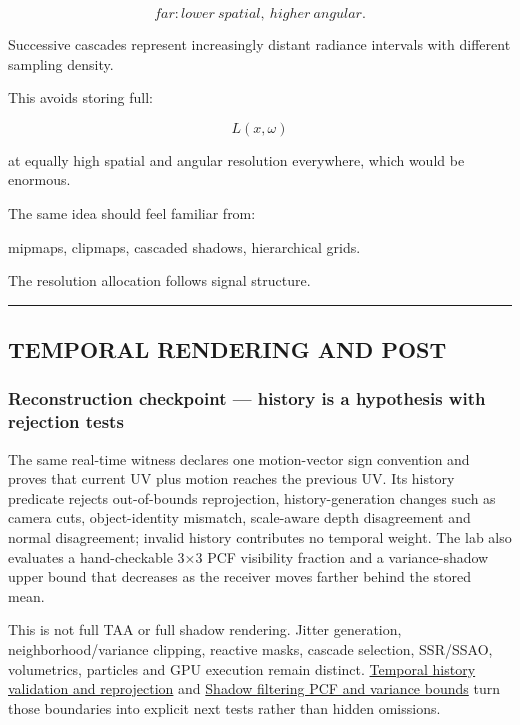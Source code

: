 \[
\boxed{
far:
lower\ spatial,\ higher\ angular.
}
\]

Successive cascades represent increasingly distant radiance intervals with different sampling density.

This avoids storing full:

\[
L(x,\omega)
\]

at equally high spatial and angular resolution everywhere, which would be enormous.

The same idea should feel familiar from:

mipmaps, clipmaps, cascaded shadows, hierarchical grids.

The resolution allocation follows signal structure.

\begin{center}\rule{0.5\linewidth}{0.5pt}\end{center}

\subsection{TEMPORAL RENDERING AND POST}\label{04-visual-computing-ii-ch040-temporal-rendering-and-post}

\subsubsection{Reconstruction checkpoint --- history is a hypothesis with rejection tests}\label{04-visual-computing-ii-ch040-reconstruction-checkpoint-history-is-a-hypothesis-with-rejection-tests}

The same real-time witness declares one motion-vector sign convention and proves that current UV plus motion reaches the previous UV. Its history predicate rejects out-of-bounds reprojection, history-generation changes such as camera cuts, object-identity mismatch, scale-aware depth disagreement and normal disagreement; invalid history contributes no temporal weight. The lab also evaluates a hand-checkable 3×3 PCF visibility fraction and a variance-shadow upper bound that decreases as the receiver moves farther behind the stored mean.

This is not full TAA or full shadow rendering. Jitter generation, neighborhood/variance clipping, reactive masks, cascade selection, SSR/SSAO, volumetrics, particles and GPU execution remain distinct. \hyperref[appendix-e8c352e39466]{Temporal history validation and reprojection} and \hyperref[appendix-7cac8a689849]{Shadow filtering PCF and variance bounds} turn those boundaries into explicit next tests rather than hidden omissions.

